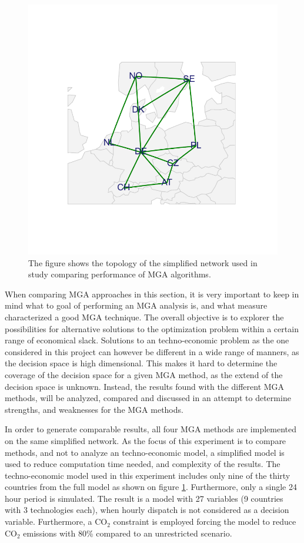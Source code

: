 \begin{figure}[h]\centering
	\includegraphics[width=.7\textwidth,trim={0 2.8cm 0 3cm},clip]{./Images/comparison_topology}
	\caption{The figure shows the topology of the simplified network used in study comparing performance of MGA algorithms. }
	\label{fig:comparison_topology}
\end{figure}


When comparing MGA approaches in this section, it is very important to keep in mind what to goal of performing an MGA analysis is, and what measure characterized a good MGA technique. The overall objective is to explorer the possibilities for alternative solutions to the optimization problem within a certain range of economical slack. Solutions to an techno-economic problem as the one considered in this project can however be different in a wide range of manners, as the decision space is high dimensional. This makes it hard to determine the coverage of the decision space for a given MGA method, as the extend of the decision space is unknown. Instead, the results found with the different MGA methods, will be analyzed, compared and discussed in an attempt to determine strengths, and weaknesses for the MGA methods. 

In order to generate comparable results, all four MGA methods are implemented on the same simplified network. As the focus of this experiment is to compare methods, and not to analyze an techno-economic model, a simplified model is used to reduce computation time needed, and complexity of the results. The techno-economic model used in this experiment includes only nine of the thirty countries from the full model as shown on figure \ref{fig:comparison_topology}. Furthermore, only a single 24 hour period is simulated. The result is a model with 27 variables (9 countries with 3 technologies each), when hourly dispatch is not considered as a decision variable. Furthermore, a $\text{CO}_2$ constraint is employed forcing the model to reduce $\text{CO}_2$ emissions with 80\% compared to an unrestricted scenario. 

